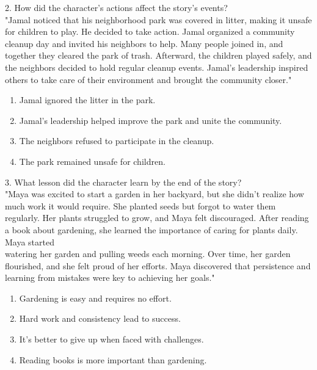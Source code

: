 \documentclass[12pt]{article}
\begin{document}
2. How did the character’s actions affect the story’s events?\\
"Jamal noticed that his neighborhood park was covered in litter, making it unsafe for children to play. He decided to take action. Jamal organized a community cleanup day and invited his neighbors to help. Many people joined in, and together they cleared the park of trash. Afterward, the children played safely, and the neighbors decided to hold regular cleanup events. Jamal’s leadership inspired others to take care of their environment and brought the community closer."\\
\begin{enumerate}[label=\Alph*.]
    \item Jamal ignored the litter in the park.  
    \item Jamal’s leadership helped improve the park and unite the community.  
    \item The neighbors refused to participate in the cleanup.  
    \item The park remained unsafe for children.  
\end{enumerate}

\vspace{1cm}

3. What lesson did the character learn by the end of the story?\\
"Maya was excited to start a garden in her backyard, but she didn’t realize how much work it would require. She planted seeds but forgot to water them regularly. Her plants struggled to grow, and Maya felt discouraged. After reading a book about gardening, she learned the importance of caring for plants daily. Maya started \\watering her garden and pulling weeds each morning. Over time, her garden \\flourished, and she felt proud of her efforts. Maya discovered that persistence and learning from mistakes were key to achieving her goals."\\
\begin{enumerate}[label=\Alph*.]
    \item Gardening is easy and requires no effort.  
    \item Hard work and consistency lead to success.  
    \item It’s better to give up when faced with challenges.  
    \item Reading books is more important than gardening.  
\end{enumerate}
\end{document}
